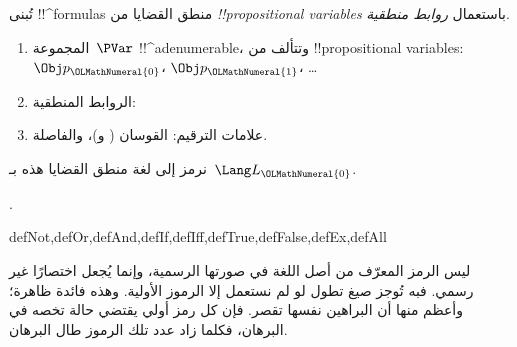 \documentclass[../../../include/open-logic-section]{subfiles}
\begin{document}


تُبنى !!^{formula}s منطق القضايا من
\emph{!!{propositional
    variable}s} باستعمال \emph{روابط
  منطقية}.

\begin{enumerate}
\item المجموعة~$\PVar$ !!^a{denumerable}، وتتألف من
  !!{propositional variable}s: $\Obj p_{\OLMathNumeral{0}}$، $\Obj p_{\OLMathNumeral{1}}$، \dots
{}
\item الروابط المنطقية:
  \startycommalist
\item علامات الترقيم: القوسان ( و)، والفاصلة.
\end{enumerate}

نرمز إلى لغة منطق القضايا هذه بـ~$\Lang L_{\OLMathNumeral{0}}$.

.

\begin{tagblock}{defNot,defOr,defAnd,defIf,defIff,defTrue,defFalse,defEx,defAll}
\begin{explain}
ليس الرمز المعرّف من أصل اللغة في صورتها الرسمية، وإنما يُجعل اختصارًا غير رسمي. فبه تُوجز صيغ تطول لو لم نستعمل إلا الرموز الأولية. وهذه فائدة ظاهرة؛ وأعظم منها أن البراهين نفسها تقصر. فإن كل رمز أولي يقتضي حالة تخصه في البرهان، فكلما زاد عدد تلك الرموز طال البرهان.
\end{explain}
\end{tagblock}

\end{document}
